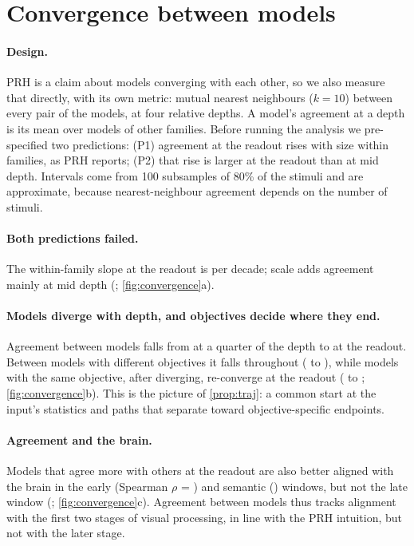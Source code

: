 \documentclass[10pt]{article}
\theoremstyle{plain}
\theoremstyle{definition}
\theoremstyle{remark}
\newif\ifhrhconv \hrhconvfalse
\begin{document}
\ifhrhconv
\section{Convergence between models}
\label{sec:convergence}

\paragraph{Design.} PRH is a claim about models converging with each other, so we also measure
that directly, with its own metric: mutual nearest neighbours ($k=10$) between every pair of the
\vNall{} models, at four relative depths. A model's agreement at a depth is its mean over models
of other families. Before running the analysis we pre-specified two predictions: (P1) agreement
at the readout rises with size within families, as PRH reports; (P2) that rise is larger at the
readout than at mid depth. Intervals come from 100 subsamples of 80\% of the stimuli and are
approximate, because nearest-neighbour agreement depends on the number of stimuli.

\paragraph{Both predictions failed.} The within-family slope at the readout is \vConvSlopeOut{}
per decade; scale adds agreement mainly at mid depth (\vConvSlopeMid; \cref{fig:convergence}a).

\paragraph{Models diverge with depth, and objectives decide where they end.} Agreement between
models falls from \vAgreeQ{} at a quarter of the depth to \vAgreeOut{} at the readout. Between
models with different objectives it falls throughout (\vAgreeDiffQ{} to \vAgreeDiffOut), while
models with the same objective, after diverging, re-converge at the readout (\vAgreeSameTQ{} to
\vAgreeSameOut; \cref{fig:convergence}b). This is the picture of \cref{prop:traj}: a common
start at the input's statistics and paths that separate toward objective-specific endpoints.

\paragraph{Agreement and the brain.} Models that agree more with others at the readout are also
better aligned with the brain in the early (Spearman $\rho$ = \vConvBrainEarly) and semantic
(\vConvBrainMid) windows, but not the late window (\vConvBrainLate; \cref{fig:convergence}c).
Agreement between models thus tracks alignment with the first two stages of visual processing,
in line with the PRH intuition, but not with the later stage.
\end{document}
